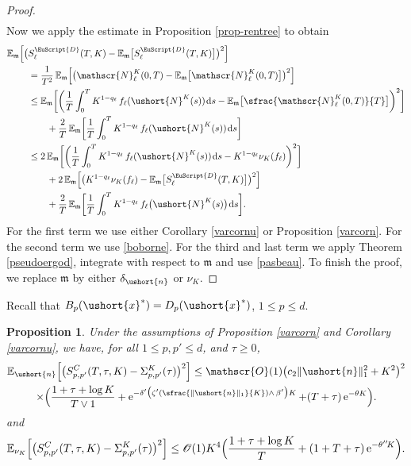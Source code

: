 \documentclass[JEP,XML,SOM,Unicode]{cedram}
\newcommand{\Psfrac}[2]{(\sfrac{#1}{#2})}
\newcommand{\scaleto}[2]{#1}
\let\mathcal\mathscr
\numberwithin{equation}{section}
\theoremstyle{plain}
\newtheorem{proposition}[theorem]{Proposition}
\theoremstyle{definition}
\newcommand{\E}{{\mathbb{E}}}
\newcommand{\Oun}{\mathcal{O}(1)}
\newcommand{\sK}{K}
\newcommand{\vecn}{\ushort{n}}
\newcommand{\vecxf}{\ushort{x}^*}
\newcommand{\leproc}{\ushort{N}^{K}}
\newcommand{\nuk}{\nu_{K}}\let\snuk\nuk
\newcommand{\e}{\operatorname{e}}
\newcommand{\dd}{\hspace{1pt}\mathrm{d}}
\newcommand{\norm}[1]{\|#1\|_{1}}\let\snorm\norm
\begin{document}
\begin{proof}
\begin{multline}
\end{multline}
Now we apply the estimate in Proposition \ref{prop-rentree} to obtain
\begin{align*}
\E_{\mathfrak{m}} \Bigl[\bigl(&S^{{\EuScript{D}}}_{\ell}(T,K) -\E_{\mathfrak{m}}\bigl[S^{\EuScript{D}}_{\ell}(T,K)\bigr]\bigr)^2\Bigr]\\
& =\frac{1}{T^2} \, \E_{\mathfrak{m}} \Bigl[\bigl(\mathcal{N}^{\sK}_\ell(0,T) -
\E_{\mathfrak{m}}\bigl[\mathcal{N}^{\sK}_\ell(0,T)\bigr]\bigr)^2\Bigr]\\
& \leq \E_{\mathfrak{m}} \biggl[\biggl(
\frac{1}{T} \int_0^T K^{1-q_\ell}\, f_\ell(\leproc(s)) \dd s -\E_{\mathfrak{m}}\bigl[\sfrac{\mathcal{N}^{\sK}_\ell(0,T)}{T}\bigr]
\biggr)^2\biggr]\\
& \qquad + \frac{2}{T} \, \E_{\mathfrak{m}}\biggl[
\frac{1}{T} \int_0^T K^{1-q_\ell} \, f_\ell(\leproc(s)) \dd s
\biggr] \\
& \leq 2\,\E_{\mathfrak{m}}\biggl[\biggl(
\frac{1}{T} \int_0^T K^{1-q_\ell}\, f_\ell(\leproc(s)) \dd s - K^{1-q_\ell} \nuk(f_\ell)
\biggr)^2\biggr] \\
& \qquad + 2\,\E_{\mathfrak{m}}\Bigl[\bigl(K^{1-q_\ell} \nuk(f_\ell)-\E_{\mathfrak{m}}\bigl[S^{\EuScript{D}}_{\ell}(T,K)\bigr]
\bigr)^2\Bigr]\\
& \qquad + \frac{2}{T} \, \E_{\mathfrak{m}}\biggl[\frac{1}{T} \int_0^T K^{1-q_\ell} \, f_\ell\bigl(\leproc(s)\bigr) \dd s
\biggr].
\end{align*}
For the first term we use either Corollary \ref{varcornu} or Proposition \ref{varcorn}. For the second term we use
\eqref{boborne}. For the third and last term we apply Theorem \ref{pseudoergod}, integrate with respect to $\mathfrak{m}$ and use
\eqref{pasbeau}. To finish the proof, we replace $\mathfrak{m}$ by either $\delta_{\vecn}$ or $\nuk$.
\end{proof}

Recall that $B_{p}(\vecxf)=D_{p}(\vecxf)$, $1\leq p\leq d$.
\begin{proposition}
\label{vs4}
Under the assumptions of Proposition \ref{varcorn} and Corollary \ref{varcornu}, we have, for all $1\leq p,p'\leq d$, and $\tau\geq 0$,
\begin{multline*}
\E_{\vecn}\Bigl[\bigl(S^{C}_{p,p'}(T,\tau,K)-\Sigma^{\sK}_{p,p'}(\tau)\bigr)^2\Bigr]
\leq \Oun \bigl(c_2\norm{\vecn}^{2} +K^2\bigr)^2\\
\times \Bigl(\frac{1+\tau+\log K}{T\vee 1}+ \e^{-\delta'\bigl(\zeta' \Psfrac{\|\vecn\|_{1}}{K}\wedge\, \beta'\bigr)K}
+(T+\tau) \e^{-\theta K}
\Bigr).
\end{multline*}
and
\[
\E_{\snuk}\Bigl[\bigl(S^{C}_{p,p'}(T,\tau,K)-\Sigma^{\sK}_{p,p'}(\tau)\bigr)^2\Bigr]
\leq \Oun K^{\scaleto{4}{4pt}} \Bigl(\frac{1+\tau+\log K}{T}+ (1+T+\tau)\e^{-\theta''\! K} \Bigr).
\]
\end{proposition}
\end{document}
